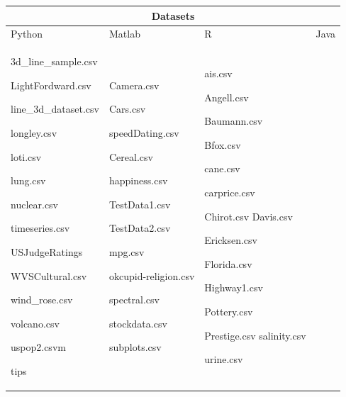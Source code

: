 \documentclass[12pt, a4paper,oneside]{report}
\begin{document}
\begin{table}[!htbp]
	\centering
	
\begin{adjustbox}{max width=1.1\textwidth,center}
	
	
	
	\begin{tabular}{|p{4cm}|p{3cm}|p{3cm}|p{4cm}|}
		
		 \hline
		 \multicolumn{4}{|c|}{Datasets} \\
		 \hline
				
		Python & Matlab & R  & Java\\ \hline
		
		3d\_line\_sample.csv \par LightFordward.csv  \par line\_3d\_dataset.csv \par
		longley.csv  \par loti.csv  \par lung.csv  \par nuclear.csv  \par timeseries.csv  \par
		USJudgeRatings	\par WVSCultural.csv  \par wind\_rose.csv  \par volcano.csv  \par uspop2.csvm \par tips &
		
		Camera.csv \par Cars.csv \par speedDating.csv \par Cereal.csv  \par happiness.csv \par TestData1.csv \par TestData2.csv  \par mpg.csv \par okcupid-religion.csv  \par spectral.csv
		\par stockdata.csv \par subplots.csv  & 
		
		ais.csv \par Angell.csv  \par Baumann.csv \par Bfox.csv \par cane.csv \par carprice.csv \par Chirot.csv
		Davis.csv \par Ericksen.csv \par Florida.csv \par Highway1.csv \par Pottery.csv \par Prestige.csv 
		salinity.csv \par urine.csv & 
		

\end{tabular}
\end{adjustbox}
\end{table}
\end{document}

